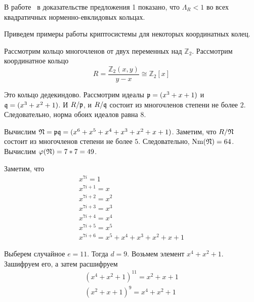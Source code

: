 \documentclass[_00_dissertation.tex]{subfiles}
\begin{document}
\begin{remark}
    В работе~\cite[с.~428]{source:Vaskouski_CSIST} в доказательстве предложения 1 показано, что $\Lambda_{R} < 1$ во всех квадратичных норменно-евклидовых кольцах.
\end{remark}

Приведем примеры работы криптосистемы для некоторых координатных колец.

\begin{example}
    Рассмотрим кольцо многочленов от двух переменных над $\mathbb{Z}_2$.
    Рассмотрим координатное кольцо
    \begin{equation*}
        R = \frac{\mathbb{Z}_2(x, y)}{y-x} \cong \mathbb{Z}_2[x]
    \end{equation*}

    Это кольцо дедекиндово.
    Рассмотрим идеалы $\mathfrak{p} = (x^3 + x + 1)$ и $\mathfrak{q} = (x^3 + x^2 + 1)$.
    И $R/\mathfrak{p}$, и $R/\mathfrak{q}$ состоит из многочленов степени не более $2$.
    Следовательно, норма обоих идеалов равна $8$.

    Вычислим $\mathfrak{N} = \mathfrak{p}\mathfrak{q} = (x^6 + x^5 + x^4 + x^3 + x^2 + x + 1)$.
    Заметим, что $R/\mathfrak{N}$ состоит из многочленов степени не более $5$.
    Следовательно, $\textrm{Nm}(\mathfrak{N}) = 64$.
    Вычислим $\varphi(\mathfrak{N}) = 7 * 7 = 49$.

    Заметим, что
    \begin{equation*}
        \begin{array}{l}
            x^{7i} = 1\\
            x^{7i+1} = x\\
            x^{7i+2} = x^2\\
            x^{7i+3} = x^3\\
            x^{7i+4} = x^4\\
            x^{7i+5} = x^5\\
            x^{7i+6} = x^5 + x^4 + x^3 + x^2 + x + 1
        \end{array}
    \end{equation*}

    Выберем случайное $e = 11$.
    Тогда $d = 9$.
    Возьмем элемент $x^4 + x^2 + 1$.
    Зашифруем его, а затем расшифруем
    \begin{equation*}
        \begin{split}
            (x^4 + x^2 + 1)^{11} = x^2 + x + 1\\
            (x^2 + x + 1)^{9} = x^4 + x^2 + 1
        \end{split}
    \end{equation*}
\end{example}
\end{document}
